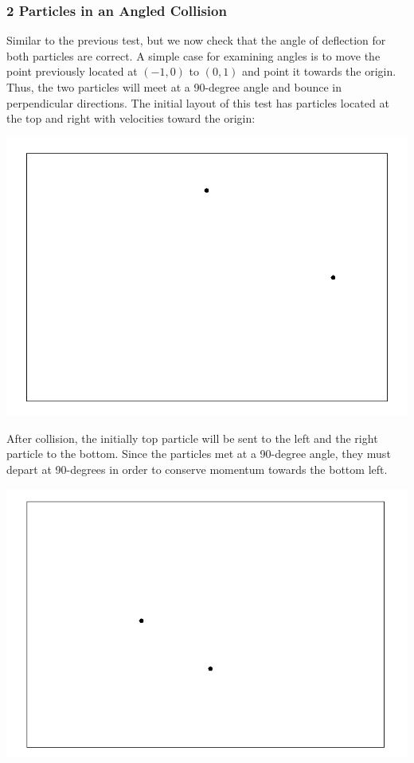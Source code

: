 \documentclass{article}
\begin{document}
\subsubsection{2 Particles in an Angled Collision}
Similar to the previous test, but we now check that the angle of deflection for both particles are correct.
A simple case for examining angles is to move the point previously located at $(-1,0)$ to $(0,1)$ and point it towards the origin.
Thus, the two particles will meet at a 90-degree angle and bounce in perpendicular directions.
The initial layout of this test has particles located at the top and right with velocities toward the origin:
\\
\begin{center}
    \includegraphics[scale=0.5]{uncharged_2_2D_start}
\end{center}

After collision, the initially top particle will be sent to the left and the right particle to the bottom.
Since the particles met at a 90-degree angle, they must depart at 90-degrees in order to conserve momentum
towards the bottom left.
\\
\begin{center}
    \includegraphics[scale=0.5]{uncharged_2_2D_after}
\end{center}
\end{document}
